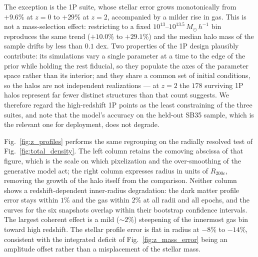 \documentclass[linenumbers,trackchanges, twocolumn]{aastex701}
\begin{document}
The exception is the 1P suite, whose stellar error grows monotonically from
$+9.6\%$ at $z=0$ to $+29\%$ at $z=2$, accompanied by a milder rise in gas. This
is not a mass-selection effect: restricting to a fixed
$10^{13}$--$10^{13.5}\,M_\odot\,h^{-1}$ bin reproduces the same trend
($+10.0\%$ to $+29.1\%$) and the median halo mass of the sample drifts by less
than $0.1$ dex. Two properties of the 1P design plausibly contribute: its
simulations vary a single parameter at a time to the edge of the prior while
holding the rest fiducial, so they populate the axes of the parameter space
rather than its interior; and they share a common set of initial conditions, so
the halos are not independent realizations --- at $z=2$ the $178$ surviving 1P
halos represent far fewer distinct structures than that count suggests. We
therefore regard the high-redshift 1P points as the least constraining of the
three suites, and note that the model's accuracy on the held-out SB35 sample,
which is the relevant one for deployment, does not degrade.

Fig.~\ref{fig:z_profiles} performs the same regrouping on the radially resolved
test of Fig.~\ref{fig:total_density}. The left column retains the comoving
abscissa of that figure, which is the scale on which pixelization and the
over-smoothing of the generative model act; the right column expresses radius in
units of $R_{200c}$, removing the growth of the halo itself from the comparison.
Neither column shows a redshift-dependent inner-radius degradation: the dark
matter profile error stays within $1\%$ and the gas within $2\%$ at all radii and
all epochs, and the curves for the six snapshots overlap within their bootstrap
confidence intervals. The largest coherent effect is a mild ($\sim\!2\%$)
steepening of the innermost gas bin toward high redshift. The stellar profile
error is flat in radius at $-8\%$ to $-14\%$, consistent with the integrated
deficit of Fig.~\ref{fig:z_mass_error} being an amplitude offset rather than a
misplacement of the stellar mass.
\end{document}

